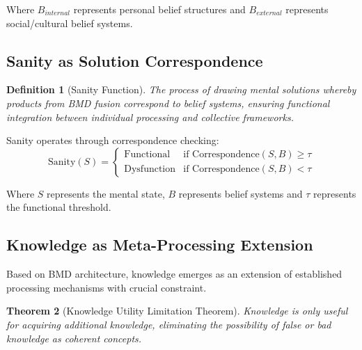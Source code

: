 \documentclass[12pt,a4paper]{article}
\newtheorem{theorem}{Theorem}[section]
\newtheorem{definition}[theorem]{Definition}
\begin{document}
Where $B_{internal}$ represents personal belief structures and $B_{external}$ represents social/cultural belief systems.

\subsection{Sanity as Solution Correspondence}

\begin{definition}[Sanity Function]
The process of drawing mental solutions whereby products from BMD fusion correspond to belief systems, ensuring functional integration between individual processing and collective frameworks.
\end{definition}

Sanity operates through correspondence checking:
\begin{equation}
\text{Sanity}(S) = \begin{cases}
\text{Functional} & \text{if } \text{Correspondence}(S, B) \geq \tau \\
\text{Dysfunction} & \text{if } \text{Correspondence}(S, B) < \tau
\end{cases}
\end{equation}

Where $S$ represents the mental state, $B$ represents belief systems and $\tau$ represents the functional threshold.

\subsection{Knowledge as Meta-Processing Extension}

Based on BMD architecture, knowledge emerges as an extension of established processing mechanisms with crucial constraint.

\begin{theorem}[Knowledge Utility Limitation Theorem]
Knowledge is only useful for acquiring additional knowledge, eliminating the possibility of false or bad knowledge as coherent concepts.
\end{theorem}
\end{document}
